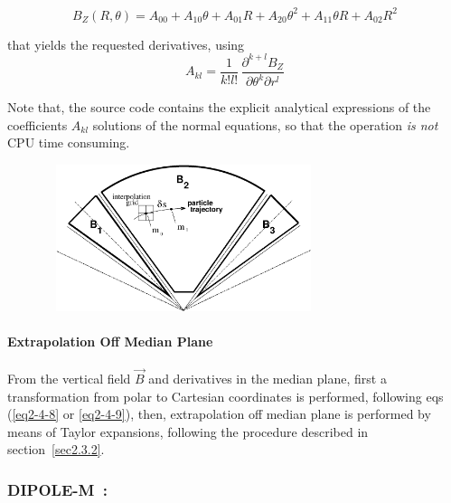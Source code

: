 $$B_Z(R,\theta) = A_{00} + A_{10}\theta + A_{01}R + A_{20}\theta^2 + A_{11}\theta R + A_{02}R^2 $$

\noindent  that yields the requested   derivatives, using 
$$	A_{kl} = \dfrac{1 }{ k!l!}\,  \dfrac{\partial^{ k+l}B_Z }{ \partial \theta^k\partial r^l} $$

\noindent Note that, the source code contains the explicit analytical 
expressions of the coefficients $A_{kl}$ solutions of the normal 
equations, so that the operation {\it is not}   CPU time consuming. 

\begin{figure}[h]
 \begin{center}
\includegraphics*[bbllx=30,bblly=150,bburx=590,bbury=400,width=8.2cm,height=4.3cm]{grid.eps}
{\setlength{\captionwidth}{12cm}
  }
  \end{center}
\end{figure}


\bigskip

\paragraph{Extrapolation Off Median Plane} 

\noindent From the vertical field $ \vec  B $ and  derivatives in the median plane, 
first a transformation from polar to Cartesian coordinates is 
performed, following eqs (\ref{eq2-4-8} or \ref{eq2-4-9}), then,  extrapolation off median plane is 
performed by means of Taylor expansions, following the procedure described in section~\ref{sec2.3.2}. 






\newpage

\subsubsection*{DIPOLE-M~: \DIPOLEMTitl} \label{DIPOLE-M} 
\medskip

